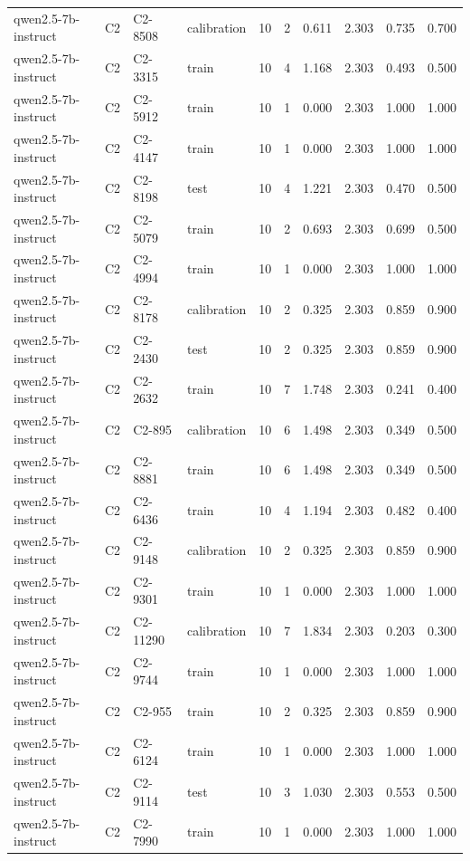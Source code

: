 \begin{table}
\begin{tabular}{llllrrrrrr}
qwen2.5-7b-instruct & C2 & C2-8508 & calibration & 10 & 2 & 0.611 & 2.303 & 0.735 & 0.700 \\
qwen2.5-7b-instruct & C2 & C2-3315 & train & 10 & 4 & 1.168 & 2.303 & 0.493 & 0.500 \\
qwen2.5-7b-instruct & C2 & C2-5912 & train & 10 & 1 & 0.000 & 2.303 & 1.000 & 1.000 \\
qwen2.5-7b-instruct & C2 & C2-4147 & train & 10 & 1 & 0.000 & 2.303 & 1.000 & 1.000 \\
qwen2.5-7b-instruct & C2 & C2-8198 & test & 10 & 4 & 1.221 & 2.303 & 0.470 & 0.500 \\
qwen2.5-7b-instruct & C2 & C2-5079 & train & 10 & 2 & 0.693 & 2.303 & 0.699 & 0.500 \\
qwen2.5-7b-instruct & C2 & C2-4994 & train & 10 & 1 & 0.000 & 2.303 & 1.000 & 1.000 \\
qwen2.5-7b-instruct & C2 & C2-8178 & calibration & 10 & 2 & 0.325 & 2.303 & 0.859 & 0.900 \\
qwen2.5-7b-instruct & C2 & C2-2430 & test & 10 & 2 & 0.325 & 2.303 & 0.859 & 0.900 \\
qwen2.5-7b-instruct & C2 & C2-2632 & train & 10 & 7 & 1.748 & 2.303 & 0.241 & 0.400 \\
qwen2.5-7b-instruct & C2 & C2-895 & calibration & 10 & 6 & 1.498 & 2.303 & 0.349 & 0.500 \\
qwen2.5-7b-instruct & C2 & C2-8881 & train & 10 & 6 & 1.498 & 2.303 & 0.349 & 0.500 \\
qwen2.5-7b-instruct & C2 & C2-6436 & train & 10 & 4 & 1.194 & 2.303 & 0.482 & 0.400 \\
qwen2.5-7b-instruct & C2 & C2-9148 & calibration & 10 & 2 & 0.325 & 2.303 & 0.859 & 0.900 \\
qwen2.5-7b-instruct & C2 & C2-9301 & train & 10 & 1 & 0.000 & 2.303 & 1.000 & 1.000 \\
qwen2.5-7b-instruct & C2 & C2-11290 & calibration & 10 & 7 & 1.834 & 2.303 & 0.203 & 0.300 \\
qwen2.5-7b-instruct & C2 & C2-9744 & train & 10 & 1 & 0.000 & 2.303 & 1.000 & 1.000 \\
qwen2.5-7b-instruct & C2 & C2-955 & train & 10 & 2 & 0.325 & 2.303 & 0.859 & 0.900 \\
qwen2.5-7b-instruct & C2 & C2-6124 & train & 10 & 1 & 0.000 & 2.303 & 1.000 & 1.000 \\
qwen2.5-7b-instruct & C2 & C2-9114 & test & 10 & 3 & 1.030 & 2.303 & 0.553 & 0.500 \\
qwen2.5-7b-instruct & C2 & C2-7990 & train & 10 & 1 & 0.000 & 2.303 & 1.000 & 1.000 \\

\end{tabular}
\end{table}
